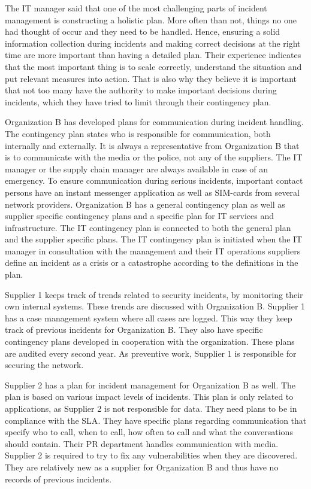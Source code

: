 The \acs{IT} manager said that one of the most challenging parts of incident management is constructing a holistic plan. More often than not, things no one had thought of occur and they need to be handled. Hence, ensuring a solid information collection during incidents and making correct decisions at the right time are more important than having a detailed plan. Their experience indicates that the most important thing is to scale correctly, understand the situation and put relevant measures into action. That is also why they believe it is important that not too many have the authority to make important decisions during incidents, which they have tried to limit through their contingency plan.

Organization B has developed plans for communication during incident handling. The contingency plan states who is responsible for communication, both internally and externally. It is always a representative from Organization B that is to communicate with the media or the police, not any of the suppliers. The IT manager or the supply chain manager are always available in case of an emergency. To ensure communication during serious incidents, important contact persons have an instant messenger application as well as SIM-cards from several network providers. Organization B has a general contingency plan as well as supplier specific contingency plans and a specific plan for IT services and infrastructure. The IT contingency plan is connected to both the general plan and the supplier specific plans. The IT contingency plan is initiated when the IT manager in consultation with the management and their IT operations suppliers define an incident as a crisis or a catastrophe according to the definitions in the plan.

Supplier 1 keeps track of trends related to security incidents, by monitoring their own internal systems. These trends are discussed with Organization B. Supplier 1 has a case management system where all cases are logged. This way they keep track of previous incidents for Organization B. They also have specific contingency plans developed in cooperation with the organization. These plans are audited every second year. As preventive work, Supplier 1 is responsible for securing the network.

Supplier 2 has a plan for incident management for Organization B as well. The plan is based on various impact levels of incidents. This plan is only related to applications, as Supplier 2 is not responsible for data. They need plans to be in compliance with the \ac{SLA}. They have specific plans regarding communication that specify who to call, when to call, how often to call and what the conversations should contain. Their PR department handles communication with media. Supplier 2 is required to try to fix any vulnerabilities when they are discovered. They are relatively new as a supplier for Organization B and thus have no records of previous incidents.

